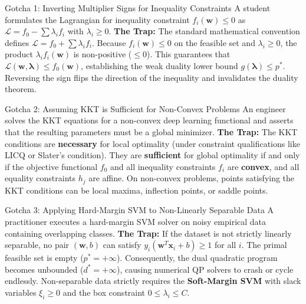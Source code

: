 \begin{trapbox}{Gotcha 1: Inverting Multiplier Signs for Inequality Constraints}
A student formulates the Lagrangian for inequality constraint $f_i(\mathbf{w}) \le 0$ as $\mathcal{L} = f_0 - \sum \lambda_i f_i$ with $\lambda_i \ge 0$.
\tcblower
\textbf{The Trap:} The standard mathematical convention defines $\mathcal{L} = f_0 + \sum \lambda_i f_i$. Because $f_i(\mathbf{w}) \le 0$ on the feasible set and $\lambda_i \ge 0$, the product $\lambda_i f_i(\mathbf{w})$ is non-positive ($\le 0$). This guarantees that $\mathcal{L}(\mathbf{w}, \boldsymbol{\lambda}) \le f_0(\mathbf{w})$, establishing the weak duality lower bound $g(\boldsymbol{\lambda}) \le p^*$. Reversing the sign flips the direction of the inequality and invalidates the duality theorem.
\end{trapbox}

\begin{trapbox}{Gotcha 2: Assuming KKT is Sufficient for Non-Convex Problems}
An engineer solves the KKT equations for a non-convex deep learning functional and asserts that the resulting parameters must be a global minimizer.
\tcblower
\textbf{The Trap:} The KKT conditions are \textbf{necessary} for local optimality (under constraint qualifications like LICQ or Slater's condition). They are \textbf{sufficient} for global optimality if and only if the objective functional $f_0$ and all inequality constraints $f_i$ are \textbf{convex}, and all equality constraints $h_j$ are affine. On non-convex problems, points satisfying the KKT conditions can be local maxima, inflection points, or saddle points.
\end{trapbox}

\begin{trapbox}{Gotcha 3: Applying Hard-Margin SVM to Non-Linearly Separable Data}
A practitioner executes a hard-margin SVM solver on noisy empirical data containing overlapping classes.
\tcblower
\textbf{The Trap:} If the dataset is not strictly linearly separable, no pair $(\mathbf{w}, b)$ can satisfy $y_i(\mathbf{w}^T \mathbf{x}_i + b) \ge 1$ for all $i$. The primal feasible set is empty ($p^* = +\infty$). Consequently, the dual quadratic program becomes unbounded ($d^* = +\infty$), causing numerical QP solvers to crash or cycle endlessly. Non-separable data strictly requires the \textbf{Soft-Margin SVM} with slack variables $\xi_i \ge 0$ and the box constraint $0 \le \lambda_i \le C$.
\end{trapbox}

